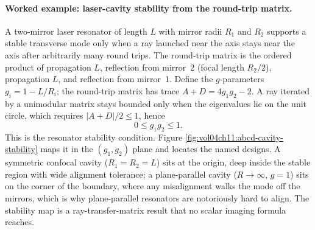 \paragraph{Worked example: laser-cavity stability from the round-trip matrix.}
A two-mirror laser resonator of length $L$ with mirror radii $R_1$ and $R_2$
supports a stable transverse mode only when a ray launched near the axis stays
near the axis after arbitrarily many round trips. The round-trip matrix is the
ordered product of propagation $L$, reflection from mirror~2 (focal length
$R_2/2$), propagation $L$, and reflection from mirror~1. Define the
$g$-parameters $g_i = 1 - L/R_i$; the round-trip matrix has trace $A + D =
4 g_1 g_2 - 2$. A ray iterated by a unimodular matrix stays bounded only when
the eigenvalues lie on the unit circle, which requires $|A + D|/2 \le 1$, hence
\[
0 \le g_1 g_2 \le 1 .
\]
This is the resonator stability condition. Figure
\ref{fig:vol04ch11:abcd-cavity-stability} maps it in the $(g_1, g_2)$ plane and
locates the named designs. A symmetric confocal cavity ($R_1 = R_2 = L$) sits at
the origin, deep inside the stable region with wide alignment tolerance; a
plane-parallel cavity ($R \to \infty$, $g = 1$) sits on the corner of the
boundary, where any misalignment walks the mode off the mirrors, which is why
plane-parallel resonators are notoriously hard to align. The stability map is a
ray-transfer-matrix result that no scalar imaging formula reaches.



